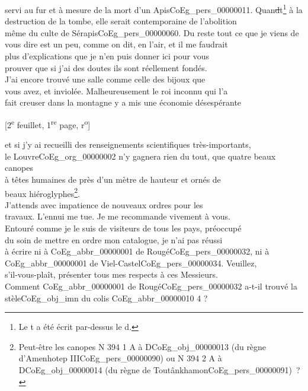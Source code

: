 \documentclass{book}
\begin{document}
servi au fur et à mesure de la mort d’un Apis\gls{CoEg_pers_00000011}. Quan\sout{d}t\footnote{Le t a été écrit par-dessus le d.} à la\\
destruction de la tombe, elle serait contemporaine de l’abolition\\
même du culte de Sérapis\gls{CoEg_pers_00000060}. Du reste tout ce que je viens de\\
vous dire est un peu, comme on dit, en l’air, et il me faudrait\\
plus d’explications que je n’en puis donner ici pour vous\\
prouver que si j’ai des doutes ils sont réellement fondés.\\
\indent J’ai encore trouvé une salle comme celle des bijoux que\\
vous avez, et inviolée. Malheureusement le roi inconnu qui l’a\\
fait creuser dans la montagne y a mis une économie désespérante
{\footnotesize\begin{center} {[2\textsuperscript{e} feuillet, 1\textsuperscript{re} page, r\textsuperscript{o}]}\end{center}}
\noindent et si j’y ai recueilli des renseignements scientifiques très-importants,\\
le Louvre\gls{CoEg_org_00000002} n’y gagnera rien du tout, que quatre beaux canopes\\
à têtes humaines de près d’un mètre de hauteur et ornés de\\
beaux hiéroglyphes\footnote{Peut-être les canopes N 394 1 A à D\gls{CoEg_obj_00000013} (du règne d'Amenhotep III\gls{CoEg_pers_00000090}) ou N 394 2 A à D\gls{CoEg_obj_00000014} (du règne de Toutânkhamon\gls{CoEg_pers_00000091})~?}.\\
\indent J’attends avec impatience de nouveaux ordres pour les\\
travaux. L’ennui me tue. Je me recommande vivement à vous.\\
Entouré comme je le suis de visiteurs de tous les pays, préoccupé\\
du soin de mettre en ordre mon catalogue, je n’ai pas réussi\\
à écrire ni à \gls{CoEg_abbr_00000001} de Rougé\gls{CoEg_pers_00000032}, ni à \gls{CoEg_abbr_00000001} de Viel-Castel\gls{CoEg_pers_00000034}. Veuillez,\\
s’il-vous-plaît, présenter tous mes respects à ces Messieurs.\\
Comment \gls{CoEg_abbr_00000001} de Rougé\gls{CoEg_pers_00000032} a-t-il trouvé la stèle\gls{CoEg_obj_imn} du colis \gls{CoEg_abbr_00000010} 4 ?\\
\end{document}
